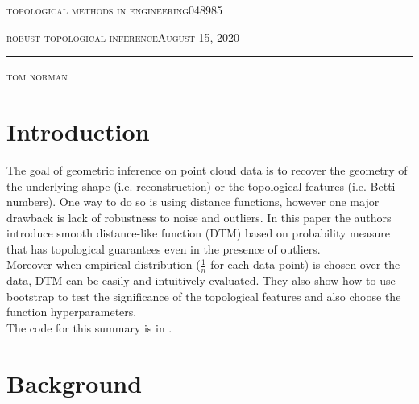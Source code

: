 \documentclass[11pt]{article}
\theoremstyle{definition}
\theoremstyle{definition}
\def \lecturedate {August 15, 2020}
\begin{document}
\noindent
\begin{minipage}[t]{1\columnwidth}%
\textsc{topological methods in engineering}\hspace*{\fill}048985
\vspace{2mm}

\textsc{\LARGE robust topological inference}\hspace*{\fill}\textsc{\lecturedate}

\noindent \rule[0.5ex]{1\linewidth}{1pt}

\textsc{tom norman}
\vspace{10mm}
\end{minipage}



\newcommand {\image}[5] {
    \begin{figure}
        \begin{center}
		\texttt{[image: imgs/\#1]}
		\caption{#2}
		\label{#5}
        \end{center}
    \end{figure}
}


\section{Introduction}
	The goal of geometric inference on point cloud data is to recover the geometry of the underlying shape (i.e. reconstruction) or the topological features (i.e. Betti numbers).
	One way to do so is using distance functions, however one major drawback is lack of robustness to noise and outliers.
	In  this paper the authors introduce smooth distance-like function (DTM) based on probability measure that has topological guarantees even in the presence of outliers.\\
	Moreover when empirical distribution ($\frac{1}{n}$ for each data point) is chosen over the data, DTM can be easily and intuitively evaluated.
	They also show how to use bootstrap to test the significance of the topological features and also choose the function hyperparameters.\\
	The code for this summary is in \cite{git}.
\section{Background}
\end{document}
